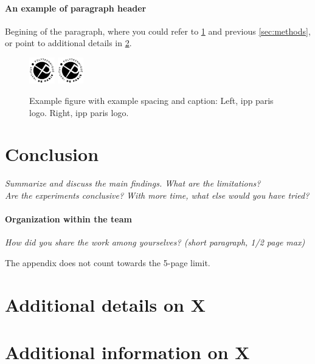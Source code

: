 \documentclass[11pt]{article}
\begin{document}
\paragraph{An example of paragraph header} 
Begining of the paragraph, where you could refer to \cref{fig:my_label} and previous \cref{sec:methods}, or point to additional details in \cref{app:sec:details}.

\begin{figure}[h]
    \centering
    \includegraphics[width=0.1\textwidth]{figures/ipparis.png}
    \hspace{0.2\textwidth}
    \includegraphics[width=0.1\textwidth]{figures/ipparis.png}
    \caption{Example figure with example spacing and caption: Left, ipp paris logo. Right, ipp paris logo.}
    \label{fig:my_label}
\end{figure}

\section{Conclusion}
\textit{Summarize and discuss the main findings. What are the limitations?\\
Are the experiments conclusive? With more time, what else would you have tried?}

\paragraph{Organization within the team}
\textit{How did you share the work among yourselves? (short paragraph, 1/2 page max)}




\appendix

\newpage
The appendix does not count towards the 5-page limit. 
\section{Additional details on X}
\label{app:sec:details}

\section{Additional information on X}
\end{document}
